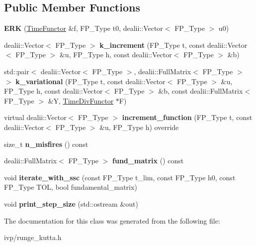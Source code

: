 \subsection*{Public Member Functions}
\begin{DoxyCompactItemize}
\item 
\mbox{\label{classERK_a2e9bccb7699bc97bd3800c25d86ee814}} 
{\bfseries E\+RK} (\hyperlink{classTimeFunctor}{Time\+Functor} \&f, F\+P\+\_\+\+Type t0, dealii\+::\+Vector$<$ F\+P\+\_\+\+Type $>$ u0)
\item 
\mbox{\label{classERK_afebd211b4d191591950da1544a1e2051}} 
dealii\+::\+Vector$<$ F\+P\+\_\+\+Type $>$ {\bfseries k\+\_\+increment} (F\+P\+\_\+\+Type t, const dealii\+::\+Vector$<$ F\+P\+\_\+\+Type $>$ \&u, F\+P\+\_\+\+Type h, const dealii\+::\+Vector$<$ F\+P\+\_\+\+Type $>$ \&b)
\item 
\mbox{\label{classERK_a44ab542f5f577a322819c0a05a791db0}} 
std\+::pair$<$ dealii\+::\+Vector$<$ F\+P\+\_\+\+Type $>$, dealii\+::\+Full\+Matrix$<$ F\+P\+\_\+\+Type $>$ $>$ {\bfseries k\+\_\+variational} (F\+P\+\_\+\+Type t, const dealii\+::\+Vector$<$ F\+P\+\_\+\+Type $>$ \&u, F\+P\+\_\+\+Type h, const dealii\+::\+Vector$<$ F\+P\+\_\+\+Type $>$ \&b, const dealii\+::\+Full\+Matrix$<$ F\+P\+\_\+\+Type $>$ \&Y, \hyperlink{classTimeDivFunctor}{Time\+Div\+Functor} $\ast$F)
\item 
\mbox{\label{classERK_ad6b4a1f225469f47dad5b17bb6791f30}} 
virtual dealii\+::\+Vector$<$ F\+P\+\_\+\+Type $>$ {\bfseries increment\+\_\+function} (F\+P\+\_\+\+Type t, const dealii\+::\+Vector$<$ F\+P\+\_\+\+Type $>$ \&u, F\+P\+\_\+\+Type h) override
\item 
\mbox{\label{classERK_ae3f71b3f5364ffcab63a715d95adb911}} 
size\+\_\+t {\bfseries n\+\_\+misfires} () const
\item 
\mbox{\label{classERK_ac8835e6d68d903c7111da0b077821e3b}} 
dealii\+::\+Full\+Matrix$<$ F\+P\+\_\+\+Type $>$ {\bfseries fund\+\_\+matrix} () const
\item 
\mbox{\label{classERK_a7d23b9eb9d2f8defa0ca371e2f8cc2bc}} 
void {\bfseries iterate\+\_\+with\+\_\+ssc} (const F\+P\+\_\+\+Type t\+\_\+lim, const F\+P\+\_\+\+Type h0, const F\+P\+\_\+\+Type T\+OL, bool fundamental\+\_\+matrix)
\item 
\mbox{\label{classERK_a6057b70fbd97bbe2e5b2d0233aef46a4}} 
void {\bfseries print\+\_\+step\+\_\+size} (std\+::ostream \&out)
\end{DoxyCompactItemize}


The documentation for this class was generated from the following file\+:\begin{DoxyCompactItemize}
\item 
ivp/runge\+\_\+kutta.\+h\end{DoxyCompactItemize}
